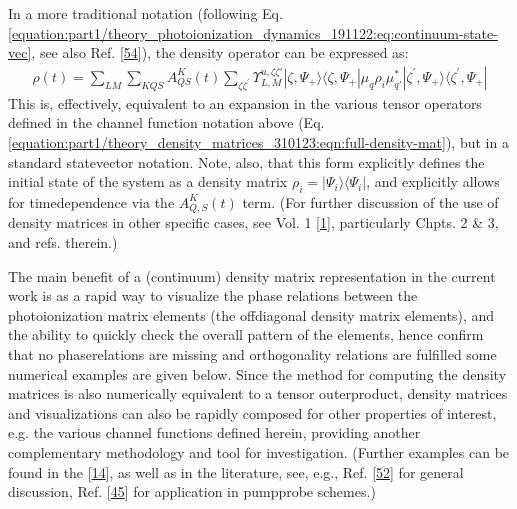 \documentclass[letterpaper,table,10pt,english]{jupyterBook}
\begin{document}
\sphinxAtStartPar
In a more traditional notation (following Eq. \eqref{equation:part1/theory_photoionization_dynamics_191122:eq:continuum-state-vec}, see also Ref. {[}\hyperlink{cite.backmatter/bibliography:id536}{54}{]}), the density operator can be expressed as:
\begin{equation}\label{equation:part1/theory_density_matrices_310123:eqn:full-density-mat-traditional}
\begin{split}
\rho(t) =\sum_{LM}\sum_{KQS}A^{K}_{QS}(t)\sum_{\zeta\zeta^{\prime}}\varUpsilon_{L,M}^{u,\zeta\zeta'}|\zeta,\Psi_+\rangle\langle\zeta,\Psi_+|\mu_q\rho_i\mu_{q\prime}^{*}|\zeta^{\prime},\Psi_+\rangle\langle\zeta^{\prime},\Psi_+|
\end{split}
\end{equation}
\sphinxAtStartPar
This is, effectively, equivalent to an expansion in the various tensor operators defined in the channel function notation above (Eq. \eqref{equation:part1/theory_density_matrices_310123:eqn:full-density-mat}), but in a standard state\sphinxhyphen{}vector notation. Note, also, that this form explicitly defines the initial state of the system as a density matrix \(\rho_i = |\Psi_i\rangle\langle\Psi_i|\), and explicitly allows for time\sphinxhyphen{}dependence via the \(A_{Q,S}^{K}(t)\) term. (For further discussion of the use of density matrices in other specific cases, see  Vol. 1 {[}\hyperlink{cite.backmatter/bibliography:id569}{1}{]}, particularly Chpts. 2 \& 3, and refs. therein.)

\sphinxAtStartPar
The main benefit of a (continuum) density matrix representation in the current work is as a rapid way to visualize the phase relations between the photoionization matrix elements (the off\sphinxhyphen{}diagonal density matrix elements), and the ability to quickly check the overall pattern of the elements, hence confirm that no phase\sphinxhyphen{}relations are missing and orthogonality relations are fulfilled \sphinxhyphen{} some numerical examples are given below. Since the method for computing the density matrices is also numerically equivalent to a tensor outer\sphinxhyphen{}product, density matrices and visualizations can also be rapidly composed for other properties of interest, e.g. the various channel functions defined herein, providing another complementary methodology and tool for investigation. (Further examples can be found in the  {[}\hyperlink{cite.backmatter/bibliography:id506}{14}{]}, as well as in the literature, see, e.g., Ref. {[}\hyperlink{cite.backmatter/bibliography:id444}{52}{]} for general discussion, Ref. {[}\hyperlink{cite.backmatter/bibliography:id694}{45}{]} for application in pump\sphinxhyphen{}probe schemes.)
\end{document}
